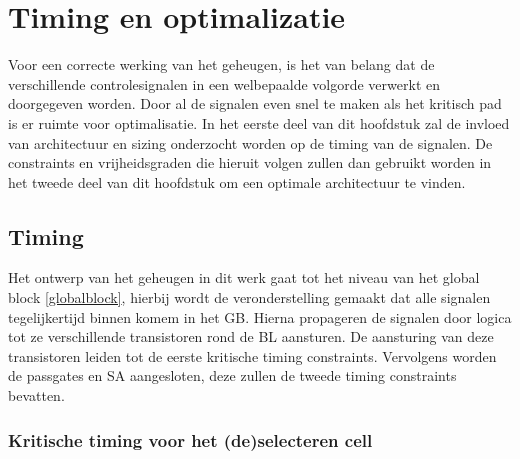 \chapter{Timing en optimalizatie}
\label{timing-optimization}
Voor een correcte werking van het geheugen, is het van belang dat de verschillende controlesignalen in een welbepaalde volgorde verwerkt en doorgegeven worden.
Door al de signalen even snel te maken als het kritisch pad is er ruimte voor optimalisatie. In het eerste deel van dit hoofdstuk zal de invloed van architectuur en sizing onderzocht worden op de timing van de signalen. De constraints en vrijheidsgraden die hieruit volgen zullen dan gebruikt worden in het tweede deel van dit hoofdstuk om een optimale architectuur te vinden.

\section{Timing}
\label{timing}
Het ontwerp van het geheugen in dit werk gaat tot het niveau van het global block \ref{globalblock}, hierbij wordt de veronderstelling gemaakt dat alle signalen tegelijkertijd binnen komem in het GB. Hierna propageren de signalen door logica tot ze verschillende transistoren rond de BL aansturen. De aansturing van deze transistoren leiden tot de eerste kritische timing constraints. Vervolgens worden de passgates en SA aangesloten, deze zullen de tweede timing constraints bevatten.

\subsection{Kritische timing voor het (de)selecteren cell}
\label{optimization}
